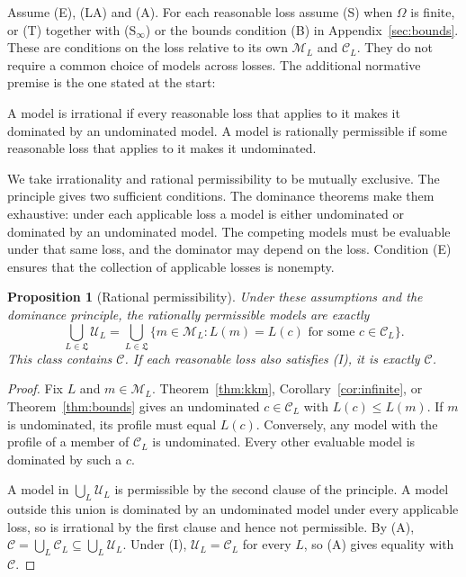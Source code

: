 \documentclass[11pt]{article}
\newtheorem{proposition}[theorem]{Proposition}
\theoremstyle{definition}
\theoremstyle{remark}
\newcommand{\M}{\mathcal M}
\newcommand{\C}{\mathcal C}
\newcommand{\U}{\mathcal U}
\begin{document}
Assume (E), (LA) and (A). For each reasonable loss assume (S) when $\Omega$ is finite, or (T) together with (S$_\infty$) or the bounds condition (B) in Appendix~\ref{sec:bounds}. These are conditions on the loss relative to its own $\M_L$ and $\C_L$. They do not require a common choice of models across losses. The additional normative premise is the one stated at the start:
\begin{description}[leftmargin=0pt]
\item[Dominance principle.] A model is irrational if every reasonable loss that applies to it makes it dominated by an undominated model. A model is rationally permissible if some reasonable loss that applies to it makes it undominated.
\end{description}
We take irrationality and rational permissibility to be mutually exclusive. The principle gives two sufficient conditions. The dominance theorems make them exhaustive: under each applicable loss a model is either undominated or dominated by an undominated model. The competing models must be evaluable under that same loss, and the dominator may depend on the loss. Condition (E) ensures that the collection of applicable losses is nonempty.

\begin{proposition}[Rational permissibility]\label{prop:permissible}
Under these assumptions and the dominance principle, the rationally permissible models are exactly
\[
 \bigcup_{L\in\mathfrak L}\U_L
 =\bigcup_{L\in\mathfrak L}
 \{m\in\M_L:L(m)=L(c)\text{ for some }c\in\C_L\}.
\]
This class contains $\C$. If each reasonable loss also satisfies (I), it is exactly $\C$.
\end{proposition}
\begin{proof}
Fix $L$ and $m\in\M_L$. Theorem~\ref{thm:kkm}, Corollary~\ref{cor:infinite}, or Theorem~\ref{thm:bounds} gives an undominated $c\in\C_L$ with $L(c)\le L(m)$. If $m$ is undominated, its profile must equal $L(c)$. Conversely, any model with the profile of a member of $\C_L$ is undominated. Every other evaluable model is dominated by such a $c$.

A model in $\bigcup_L\U_L$ is permissible by the second clause of the principle. A model outside this union is dominated by an undominated model under every applicable loss, so is irrational by the first clause and hence not permissible. By (A), $\C=\bigcup_L\C_L\subseteq\bigcup_L\U_L$. Under (I), $\U_L=\C_L$ for every $L$, so (A) gives equality with $\C$.
\end{proof}
\end{document}
